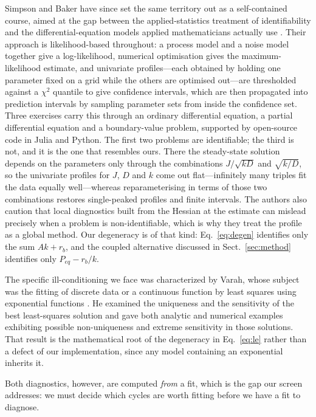 \documentclass[sigconf]{acmart}
\newcommand{\rb}{\ensuremath{r_{b}}}
\begin{document}
Simpson and Baker have since set the same territory out as a
self-contained course, aimed at the gap between the applied-statistics
treatment of identifiability and the differential-equation models
applied mathematicians actually
use \cite{simpson2026parameter}. Their approach is likelihood-based
throughout: a process model and a noise model together give a
log-likelihood, numerical optimisation gives the maximum-likelihood
estimate, and univariate profiles---each obtained by holding one
parameter fixed on a grid while the others are optimised out---are
thresholded against a $\chi^{2}$ quantile to give confidence
intervals, which are then propagated into prediction intervals by
sampling parameter sets from inside the confidence set. Three
exercises carry this through an ordinary differential equation, a
partial differential equation and a boundary-value problem, supported
by open-source code in Julia and Python. The first two problems are
identifiable; the third is not, and it is the one that resembles ours.
There the steady-state solution depends on the parameters only through
the combinations $J/\sqrt{kD}$ and $\sqrt{k/D}$, so the univariate
profiles for $J$, $D$ and $k$ come out flat---infinitely many triples
fit the data equally well---whereas reparameterising in terms of those
two combinations restores single-peaked profiles and finite intervals.
The authors also caution that local diagnostics built from the Hessian
at the estimate can mislead precisely when a problem is
non-identifiable, which is why they treat the profile as a global
method. Our degeneracy is of that kind:
Eq.~\eqref{eq:degen} identifies only the sum $Ak+\rb$, and the coupled
alternative discussed in Sect.~\ref{sec:method} identifies only
$P_{eq}-\rb/k$.

The specific ill-conditioning we face was characterized by Varah, whose
subject was the fitting of discrete data or a continuous function by
least squares using exponential functions \cite{varah1985fitting}. He
examined the uniqueness and the sensitivity of the best least-squares
solution and gave both analytic and numerical examples exhibiting
possible non-uniqueness and extreme sensitivity in those solutions.
That result is the mathematical root of the degeneracy in
Eq.~\eqref{eq:le} rather than a defect of our implementation, since any
model containing an exponential inherits it.

Both diagnostics, however, are computed \emph{from} a fit, which is the
gap our screen addresses: we must decide which cycles are worth fitting
before we have a fit to diagnose.
\end{document}
